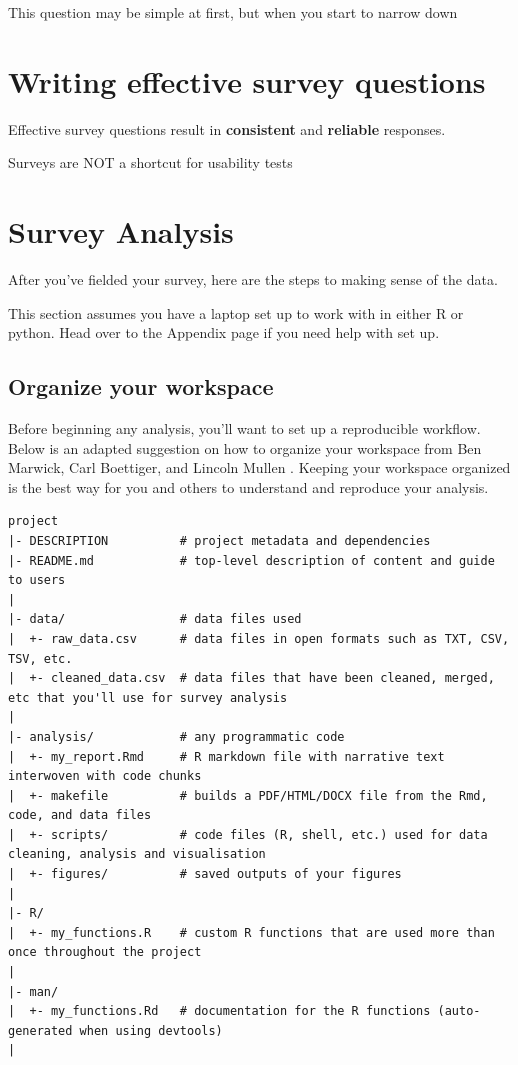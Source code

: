 \documentclass[]{book}
\begin{document}
This question may be simple at first, but when you start to narrow down

\chapter{Writing effective survey
questions}\label{writing-effective-survey-questions}

Effective survey questions result in \textbf{consistent} and
\textbf{reliable} responses.

Surveys are NOT a shortcut for usability tests

\chapter{Survey Analysis}\label{analysis}

After you've fielded your survey, here are the steps to making sense of
the data.

This section assumes you have a laptop set up to work with in either R
or python. Head over to the Appendix page if you need help with set up.

\section{Organize your workspace}\label{organize-your-workspace}

Before beginning any analysis, you'll want to set up a reproducible
workflow. Below is an adapted suggestion on how to organize your
workspace from Ben Marwick, Carl Boettiger, and Lincoln Mullen
\citep{reproducible_workflow}. Keeping your workspace organized is the
best way for you and others to understand and reproduce your analysis.

\begin{verbatim}
project
|- DESCRIPTION          # project metadata and dependencies 
|- README.md            # top-level description of content and guide to users
|
|- data/                # data files used 
|  +- raw_data.csv      # data files in open formats such as TXT, CSV, TSV, etc.
|  +- cleaned_data.csv  # data files that have been cleaned, merged, etc that you'll use for survey analysis
|
|- analysis/            # any programmatic code
|  +- my_report.Rmd     # R markdown file with narrative text interwoven with code chunks 
|  +- makefile          # builds a PDF/HTML/DOCX file from the Rmd, code, and data files
|  +- scripts/          # code files (R, shell, etc.) used for data cleaning, analysis and visualisation
|  +- figures/          # saved outputs of your figures
|
|- R/                     
|  +- my_functions.R    # custom R functions that are used more than once throughout the project
|
|- man/
|  +- my_functions.Rd   # documentation for the R functions (auto-generated when using devtools)
|
\end{verbatim}
\end{document}
